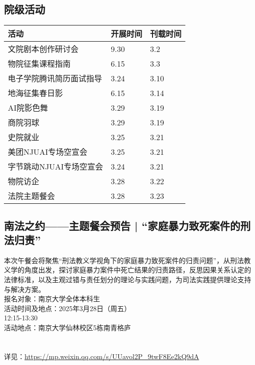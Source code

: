 \documentclass[letterpaper, 12pt]{article}
\begin{document}
\begin{multicols}{2}
\section{院级活动}
\begin{tabular}{|>{\centering\arraybackslash}m{}|m{}|m{}|}
\hline
    活动 & 开展时间 & 刊载时间\\
    \hline\hline
    文院剧本创作研讨会 & 9.30 & 3.2\\
    物院征集课程指南 & 6.15 & 3.3\\
    电子学院腾讯简历面试指导 & 3.24 & 3.10\\
    地海征集春日影 & 6.15 & 3.14\\
    AI院影色舞 & 3.29 & 3.19\\
    商院羽球 & 3.29 & 3.19\\
    史院就业 & 3.25 & 3.21\\
    美团NJUAI专场空宣会 & 3.25 & 3.21\\
    字节跳动NJUAI专场空宣会 & 3.24 & 3.21\\
    物院访企 & 3.28 & 3.22\\
    法院主题餐会 & 3.28 & 3.23\\
    \hline
\end{tabular}
\subsection{南法之约——主题餐会预告 | “家庭暴力致死案件的刑法归责”}
本次午餐会将聚焦“刑法教义学视角下的家庭暴力致死案件的归责问题”，从刑法教义学的角度出发，探讨家庭暴力案件中死亡结果的归责路径，反思因果关系认定的法律标准，以及主观过错与责任划分的理论与实践问题，为司法实践提供理论支持与解决方案。
\\报名对象：南京大学全体本科生
\\活动时间及地点：2025年3月28日（周五）
\\12:15-13:30
\\活动地点：南京大学仙林校区5栋南青格庐
\\
\\
\\详见：\url{https://mp.weixin.qq.com/s/UUavol2P_9twF8Ee2kQ9dA}


\end{multicols}
\end{document}
